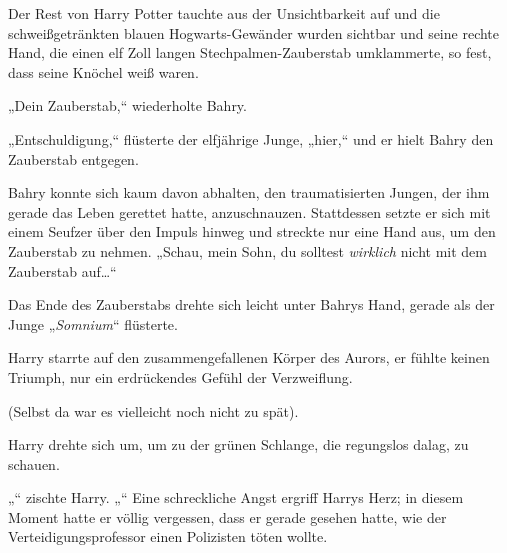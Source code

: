 Der Rest von Harry Potter tauchte aus der Unsichtbarkeit auf und die schweißgetränkten blauen Hogwarts-Gewänder wurden sichtbar und seine rechte Hand, die einen elf Zoll langen Stechpalmen-Zauberstab umklammerte, so fest, dass seine Knöchel weiß waren.

„Dein Zauberstab,“ wiederholte Bahry.

„Entschuldigung,“ flüsterte der elfjährige Junge, „hier,“ und er hielt Bahry den Zauberstab entgegen.

Bahry konnte sich kaum davon abhalten, den traumatisierten Jungen, der ihm gerade das Leben gerettet hatte, anzuschnauzen. Stattdessen setzte er sich mit einem Seufzer über den Impuls hinweg und streckte nur eine Hand aus, um den Zauberstab zu nehmen. „Schau, mein Sohn, du solltest \emph{wirklich} nicht mit dem Zauberstab auf…“

Das Ende des Zauberstabs drehte sich leicht unter Bahrys Hand, gerade als der Junge „\emph{Somnium}“ flüsterte.

\later

Harry starrte auf den zusammengefallenen Körper des Aurors, er fühlte keinen Triumph, nur ein erdrückendes Gefühl der Verzweiflung.

(Selbst da war es vielleicht noch nicht zu spät).

Harry drehte sich um, um zu der grünen Schlange, die regungslos dalag, zu schauen.

„“ zischte Harry. „“ Eine schreckliche Angst ergriff Harrys Herz; in diesem Moment hatte er völlig vergessen, dass er gerade gesehen hatte, wie der Verteidigungsprofessor einen Polizisten töten wollte.

